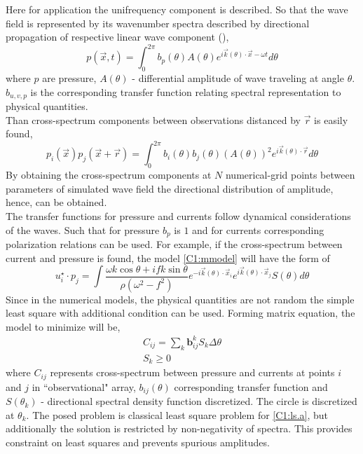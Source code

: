 Here for application the unifrequency component is described. So that the wave field is represented by its wavenumber spectra described by directional propagation of respective linear wave component (\cite{long1986inverse}),
\begin{equation}
p(\vec{x}, t) = \int_{0}^{2\pi} b_{p}(\theta) A(\theta) e^{i \vec{k}(\theta) \cdot \vec{x} - \omega t} d \theta
\end{equation}
where $p$ are pressure, $A(\theta)$ - differential amplitude of wave traveling at angle $\theta$. $b_{u,v,p}$ is the corresponding transfer function relating spectral representation to physical quantities.\\
Than cross-spectrum components between observations distanced by $\vec{r}$ is easily found,
\begin{equation}
p_i(\vec{x}) p_j(\vec{x} + \vec{r}) = \int_{0}^{2\pi} b_{i}(\theta) b_{j}(\theta) (A(\theta))^2 e^{i \vec{k}(\theta) \cdot \vec{r}} d \theta \label{C1:mmodel}
\end{equation}
By obtaining the cross-spectrum components at $N$ numerical-grid points between parameters of simulated wave field the directional distribution of amplitude, hence, can be obtained.\\
The transfer functions for pressure and currents follow dynamical considerations of the waves. Such that for pressure $b_{p}$ is $1$ and for currents corresponding polarization relations can be used. For example, if the cross-spectrum between current and pressure is found, the model \eqref{C1:mmodel} will have the form of
\begin{equation}
u_i^{\star} \cdot p_j = \int \frac{\omega k \cos \theta + i fk \sin \theta}{\rho(\omega^2 - f^2)} e^{-i \vec{k}(\theta) \cdot \vec{x}_i} e^{i \vec{k}(\theta) \cdot \vec{x}_j}  S(\theta) d \theta
\end{equation}
Since in the numerical models, the physical quantities are not random the simple least square with additional condition can be used. Forming matrix equation, the model to minimize will be,
\begin{subequations}
\begin{align}
C_{ij} = \sum_k \textbf{b}_{ij}^k S_k \Delta \theta \label{C1:ls.a} \\
S_k \geq 0 \label{C1:ls.b}
\end{align}
\end{subequations}
where $C_{ij}$ represents cross-spectrum between pressure and currents at points $i$ and $j$ in ``observational" array, $b_{ij}(\theta)$ corresponding transfer function and $S(\theta_k)$ - directional spectral density function discretized. The circle is discretized at $\theta_k$. The posed problem is classical least square problem for \eqref{C1:ls.a}, but additionally the solution is restricted by non-negativity of spectra. This provides constraint on least squares and prevents spurious amplitudes.\\
